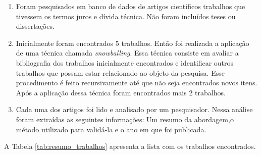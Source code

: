 \begin{enumerate}
\item Foram pesquisados em banco de dados de artigos científicos trabalhos que tivessem os termos juros e dívida técnica. Não foram incluídos teses ou dissertações.
\item Inicialmente foram encontrados 5 trabalhos. Então foi realizada a aplicação de uma técnica chamada \textit{snowballing}\cite{kruchten2013technical}. Essa técnica consiste em avaliar a bibliografia dos trabalhos inicialmente encontrados e identificar outros trabalhos que possam estar relacionado ao objeto da pesquisa. Esse procedimento é feito recursivamente até que não seja encontrados novos itens. Após a aplicação dessa técnica foram encontrados mais 2 trabalhos.
\item Cada uma dos artigos foi lido e analisado por um pesquisador. Nessa análise foram extraídas as seguintes informações: Um resumo da abordagem,o método utilizado para validá-la e o ano em que foi publicada.
\end{enumerate}

A Tabela \ref{tab:resumo_trabalhos} apresenta a lista com os trabalhos encontrados.



